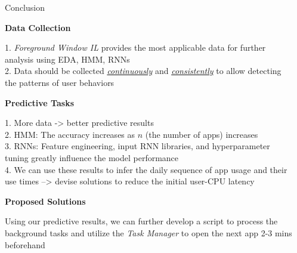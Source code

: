 \documentclass[final]{beamer}
\newlength{\sepwidth}
\newlength{\colwidth}
\newcommand{\separatorcolumn}{\begin{column}{\sepwidth}\end{column}}
\begin{document}
\begin{frame}[t]
\begin{columns}[t]
\begin{column}{\colwidth}
      \begin{block} {\LARGE{Conclusion}}

        \begin{itemize}
          \large{
          \item \textbf{Data Collection}

                1.  \textit{Foreground Window IL} provides the most applicable data for further analysis using EDA, HMM, RNNs \\
                2. Data should be collected \underline{\textit{continuously}} and \underline{\textit{consistently}} to allow detecting the patterns of user behaviors
          \item \textbf{Predictive Tasks}

                1. More data -> better predictive results \\
                2. HMM: The accuracy increases as $n$ (the number of apps) increases \\
                3. RNNs: Feature engineering, input RNN libraries, and hyperparameter tuning greatly influence the model performance \\
                4. We can use these results to infer the daily sequence of app usage and their use times --> devise solutions to reduce the initial user-CPU latency

          \item \textbf{Proposed Solutions}

                Using our predictive results, we can further develop a script to process the background tasks and utilize the \textit{Task Manager} to open the next app 2-3 mins beforehand \\
                }

        \end{itemize}
      \end{block}




    \end{column}

    \separatorcolumn
  \end{columns}
\end{frame}
\end{document}
